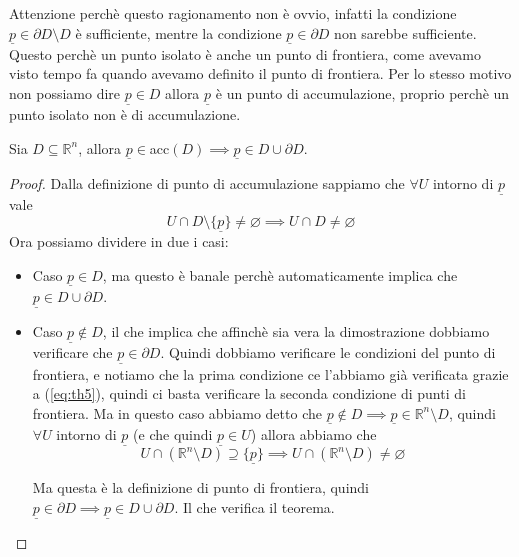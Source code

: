 \documentclass{rapport}
\begin{document}
Attenzione perchè questo ragionamento non è ovvio, infatti la condizione $\underline{p} \in \partial D\setminus D$ è sufficiente, mentre la condizione $\underline{p} \in \partial D$ non sarebbe sufficiente. Questo perchè un punto isolato è anche un punto di frontiera, come avevamo visto tempo fa quando avevamo definito il punto di frontiera. Per lo stesso motivo non possiamo dire $\underline{p}\in D$ allora $\underline{p}$ è un punto di accumulazione, proprio perchè un punto isolato non è di accumulazione.

\newpage
\begin{teorema}{}{}
  Sia $D\subseteq \mathbb{R}^n$, allora $\underline{p} \in $acc$(D) \implies \underline{p} \in D \cup \partial D$. 
\end{teorema}
\begin{proof}
  Dalla definizione di punto di accumulazione sappiamo che $\forall U$ intorno di $\underline{p}$ vale
  \begin{equation}
    \label{eq:th5}  
  U \cap D \setminus \{\underline{p}\} \ne \varnothing \implies U \cap D \ne \varnothing  
  \end{equation}
  Ora possiamo dividere in due i casi: 
  \begin{itemize}
    \item Caso $\underline{p} \in D$, ma questo è banale perchè automaticamente implica che $ \underline{p} \in D \cup \partial D$. 
    \item Caso $\underline{p} \notin D$, il che implica che affinchè sia vera la dimostrazione dobbiamo verificare che $\underline{p} \in \partial D$. Quindi dobbiamo verificare le condizioni del punto di frontiera, e notiamo che la prima condizione ce l'abbiamo già verificata grazie a (\ref{eq:th5}), quindi ci basta verificare la seconda condizione di punti di frontiera. Ma in questo caso abbiamo detto che $\underline{p} \notin D \implies \underline{p} \in \mathbb{R}^n \setminus D$, quindi $\forall U$ intorno  di $\underline{p}$ (e che quindi $\underline{p} \in U$) allora abbiamo che 
    \[
    U \cap (\mathbb{R}^n\setminus D) \supseteq \{\underline{p}\} \implies U \cap (\mathbb{R}^n\setminus D)  \ne \varnothing
    \]

    Ma questa è la definizione di punto di frontiera, quindi $\underline{p} \in \partial D \implies \underline{p} \in D \cup \partial D$. Il che verifica il teorema.
  \end{itemize}
\end{proof}
\end{document}
